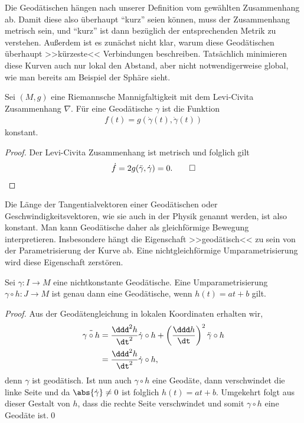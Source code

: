 \documentclass[%
	paper=a5,%
	fleqn,%
	DIV=18,%
	BCOR=0mm,
	fontsize=11pt,
	titlepage=false,%
	bibliography=totoc,
	DIV=18,%
	twoside=true,
	pdftitle=Riemannsche Geometrie,
	pdfauthor=Uwe Semmelmann,
	numbers=noendperiod]%
	{scrbook}
\begin{document}
Die Geodätischen hängen nach unserer Definition vom gewählten Zusammenhang ab. Damit diese also überhaupt ``kurz'' seien können, muss der Zusammenhang metrisch sein, und ``kurz'' ist dann bezüglich der entsprechenden Metrik zu verstehen.
Außerdem ist es zunächst nicht klar, warum diese Geodätischen überhaupt >>kürzeste<< Verbindungen
beschreiben. Tatsächlich minimieren diese Kurven auch nur lokal den Abstand,
aber nicht notwendigerweise global, wie man bereits am Beispiel der Sphäre
sieht.

\begin{lem}
Sei $(M,g)$ eine Riemannsche Mannigfaltigkeit mit dem Levi-Civita
Zusammenhang $\nabla$. Für eine Geodätische $\gamma$ ist die Funktion
\begin{align*}
f(t) = g(\dot{\gamma}(t),\dot{\gamma}(t))
\end{align*}
konstant.\fish
\end{lem}
\begin{proof}
Der Levi-Civita Zusammenhang ist metrisch und folglich gilt
\begin{align*}
\dot{f} = 2g(\ddot{\gamma},\dot\gamma) = 0.\qed
\end{align*}
\end{proof}

Die Länge der Tangentialvektoren einer Geodätischen oder Geschwindigkeitsvektoren, wie sie auch in
der Physik genannt werden,  ist also konstant. Man kann Geodätische
daher als gleichförmige Bewegung interpretieren. Insbesondere hängt die
Eigenschaft >>geodätisch<< zu sein von der Parametrisierung der Kurve ab. Eine
nichtgleichförmige Umparametrisierung wird diese Eigenschaft zerstören.

\begin{lem}
Sei $\gamma\colon I\to M$ eine nichtkonstante Geodätische. Eine Umparametrisierung $\gamma\circ h \colon J\to M$ ist genau dann eine Geodätische, wenn $h(t) = at + b$ gilt.\fish
\end{lem}
\begin{proof}
Aus der Geodätengleichung in lokalen Koordinaten erhalten wir,
\begin{align*}
\ddot{\gamma\circ h} &= \frac{\ddd^2 h}{\dt^2} \dot{\gamma}\circ h + 
\left( \frac{\ddd h}{\dt}\right)^2 \ddot{\gamma}\circ h\\
&=\frac{\ddd^2 h}{\dt^2} \dot{\gamma}\circ h,
\end{align*}
denn $\gamma$ ist geodätisch. Ist nun auch $\gamma\circ h$ eine Geodäte, dann verschwindet die linke Seite und da $\abs{\dot\gamma}\neq 0$ ist folglich $h(t) = at+b$. Umgekehrt folgt aus dieser Gestalt von $h$, dass die rechte Seite verschwindet und somit $\gamma\circ h$ eine Geodäte ist.\qed
\end{proof}
\end{document}
